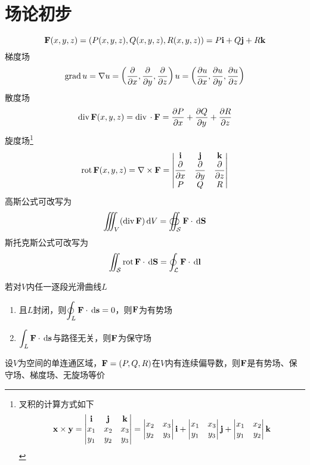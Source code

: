 
\section{场论初步}
\label{sec:field}
\[\mathbf{F}(x,y,z)=(P(x,y,z),Q(x,y,z),R(x,y,z))=P\vi+Q\vj+R\vk\]
梯度场
\[\grad u=\nabla u=\lrp{\pd{}{x},\pd{}{y},\pd{}{z}}u=\lrp{\pd{u}{x},\pd{u}{y},\pd{u}{z}}\]
散度场
\[\div \mathbf{F}(x,y,z)=\div\cdot\vF=\pd{P}{x}+\pd{Q}{y}+\pd{R}{z}\]
旋度场\footnote{叉积的计算方式如下
\[\vx\times\vy=\vmat{\vi&\vj&\vk\\x_1&x_2&x_3\\y_1&y_2&y_3}=\vmat{x_2&x_3\\y_2&y_3}\vi+\vmat{x_1&x_3\\y_1&y_3}\vj+\vmat{x_1&x_2\\y_1&y_2}\vk\]}
\[\rot \mathbf{F}(x,y,z)=\nabla\times\vF=\vmat{\vi&\vj&\vk\\\pd{}{x}&\pd{}{y}&\pd{}{z}\\P&Q&R}\]
高斯公式可改写为
\[\iiint_V(\div\vF)\diff V=\oiint_\mS\vF\cdot\diff\vS\]
斯托克斯公式可改写为
\[\iint_\mS\rot\vF\cdot\diff\vS=\oint_\mL\vF\cdot\diff\vl\]
\begin{definition}
若对$V$内任一逐段光滑曲线$L$
\begin{enumerate}
	\item 且$L$封闭，则$\disp\oint_L\vF\cdot\diff\vs=0$，则$\vF$为有势场
	\item $\disp\int_L\vF\cdot\diff\vs$与路径无关，则$\vF$为保守场
\end{enumerate}
\end{definition}
\begin{theorem}
设$V$为空间的单连通区域，$\vF=(P,Q,R)$在$V$内有连续偏导数，则$\vF$是有势场、保守场、梯度场、无旋场等价
\end{theorem}